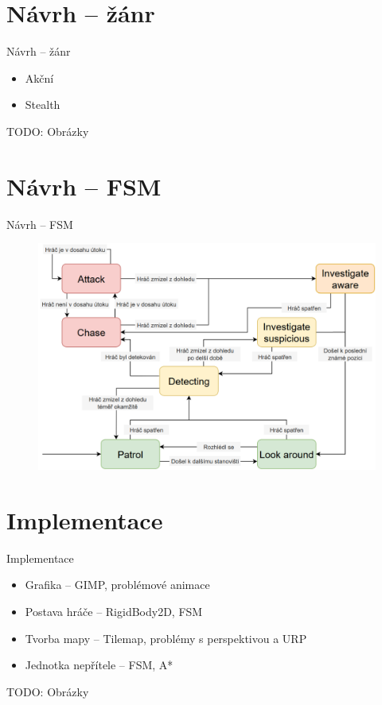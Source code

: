 \documentclass[10pt]{beamer}
\begin{document}
	\section{Návrh – žánr}
	\begin{frame}{Návrh – žánr}
		\begin{itemize}\setlength\itemsep{10pt}
			\item Akční
			\item Stealth
		\end{itemize}
		TODO: Obrázky
	\end{frame}
	
	\section{Návrh – FSM}
	\begin{frame}{Návrh – FSM}
		\begin{figure}[h]
			\centering
			\includegraphics[width=\textwidth]{Images/FSM}
		\end{figure}
	\end{frame}
	
	\section{Implementace}
	\begin{frame}{Implementace}
		\begin{itemize}\setlength\itemsep{10pt}
			\item Grafika – GIMP, problémové animace
			\item Postava hráče – RigidBody2D, FSM
			\item Tvorba mapy – Tilemap, problémy s perspektivou a URP
			\item Jednotka nepřítele – FSM, A*
		\end{itemize}
		TODO: Obrázky
	\end{frame}
	
\end{document}
